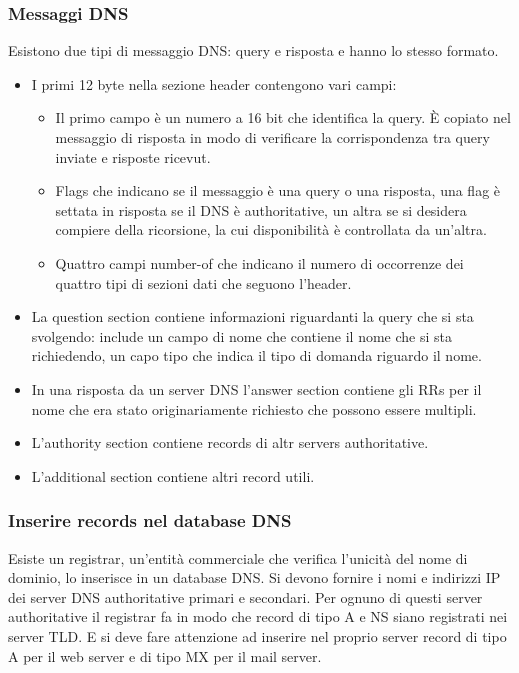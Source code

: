 \subsubsection{Messaggi DNS}
Esistono due tipi di messaggio DNS: query e risposta e hanno lo stesso formato. 
\begin{itemize}
\item I primi 12 byte nella sezione header contengono vari campi:
\begin{itemize}
\item Il primo campo \`e un numero a 16 bit che identifica la query. \`E copiato nel messaggio di risposta in modo di verificare la corrispondenza tra query inviate e risposte ricevut.
\item Flags che indicano se il messaggio \`e una query o una risposta, una flag \`e settata in risposta se il DNS \`e authoritative, un altra se si desidera compiere della ricorsione, la cui disponibilit\`a \`e controllata
da un'altra. 
\item Quattro campi number-of che indicano il numero di occorrenze dei quattro tipi di sezioni dati che seguono l'header.
\end{itemize}
\item La question section contiene informazioni riguardanti la query che si sta svolgendo: include un campo di nome che contiene il nome che si sta richiedendo, un capo tipo che indica il tipo di domanda 
riguardo il nome.
\item In una risposta da un server DNS l'answer section contiene gli RRs per il nome che era stato originariamente richiesto che possono essere multipli.
\item L'authority section contiene records di altr servers authoritative.
\item L'additional section contiene altri record utili.
\end{itemize}
\subsubsection{Inserire records nel database DNS}
Esiste un registrar, un'entit\`a commerciale che verifica l'unicit\`a del nome di dominio, lo inserisce in un database DNS. Si devono fornire i nomi e indirizzi IP dei server DNS authoritative primari e secondari. Per ognuno di questi server authoritative il registrar fa in modo che record di tipo A e NS
siano registrati nei server TLD. E si deve fare attenzione ad inserire nel proprio server record di tipo A per il web server e di tipo MX per il mail 
server.
